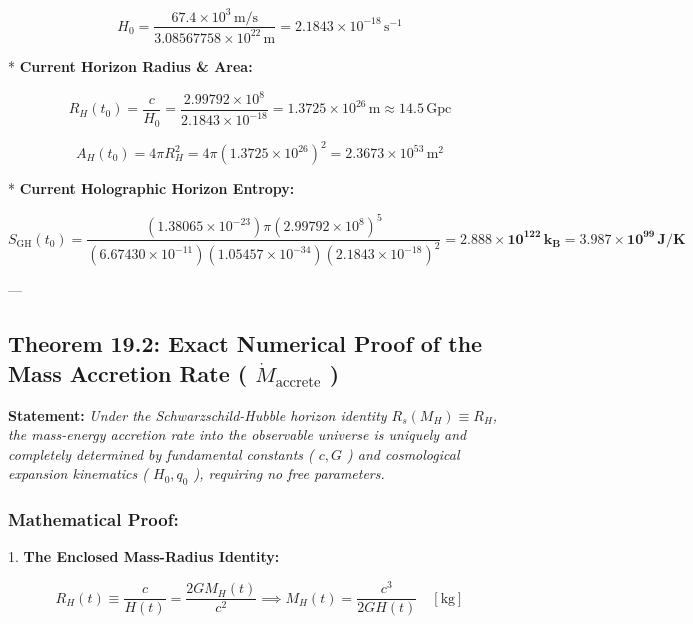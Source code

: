 \documentclass[11pt,a4paper]{article}
\theoremstyle{definition}
\theoremstyle{remark}
\begin{document}
\begin{equation}
H_0 = \frac{67.4 \times 10^3 \, \mathrm{m/s}}{3.08567758 \times 10^{22} \, \mathrm{m}} = 2.1843 \times 10^{-18} \, \mathrm{s^{-1}}
\end{equation}


* \textbf{Current Horizon Radius \& Area:}


\begin{equation}
R_H(t_0) = \frac{c}{H_0} = \frac{2.99792 \times 10^8}{2.1843 \times 10^{-18}} = 1.3725 \times 10^{26} \, \mathrm{m} \approx 14.5 \, \mathrm{Gpc}
\end{equation}



\begin{equation}
A_H(t_0) = 4\pi R_H^2 = 4\pi (1.3725 \times 10^{26})^2 = 2.3673 \times 10^{53} \, \mathrm{m^2}
\end{equation}


* \textbf{Current Holographic Horizon Entropy:}


\begin{equation}
S_{\text{GH}}(t_0) = \frac{(1.38065 \times 10^{-23}) \pi (2.99792 \times 10^8)^5}{(6.67430 \times 10^{-11})(1.05457 \times 10^{-34})(2.1843 \times 10^{-18})^2} = \mathbf{2.888 \times 10^{122} \, k_B} = \mathbf{3.987 \times 10^{99} \, J/K}
\end{equation}


---

\subsection{Theorem 19.2: Exact Numerical Proof of the Mass Accretion Rate ( $\dot{M}_{\text{accrete}}$ )}

\textbf{Statement:} \textit{Under the Schwarzschild-Hubble horizon identity $R_s(M_H) \equiv R_H$, the mass-energy accretion rate into the observable universe is uniquely and completely determined by fundamental constants ( $c, G$ ) and cosmological expansion kinematics ( $H_0, q_0$ ), requiring no free parameters.}

\subsubsection{Mathematical Proof:}
1. \textbf{The Enclosed Mass-Radius Identity:}


\begin{equation}
R_H(t) \equiv \frac{c}{H(t)} = \frac{2 G M_H(t)}{c^2} \implies M_H(t) = \frac{c^3}{2 G H(t)} \quad [\mathrm{kg}]
\end{equation}
\end{document}
